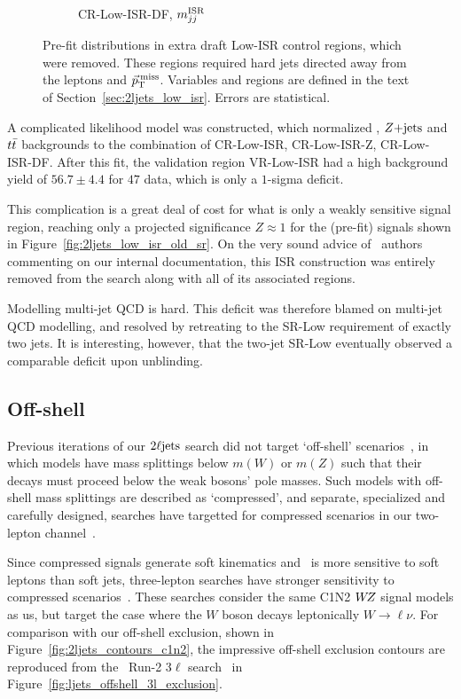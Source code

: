 \begin{figure}[tp]
\begin{subfigure}{0.62\textwidth}
\caption{CR-Low-ISR-DF, $m_{jj}^\mathrm{ISR}$}
\end{subfigure}
\caption[
Pre-fit distributions in extra draft Low-ISR control regions, which were
removed
]{%
Pre-fit distributions in extra draft Low-ISR control regions, which were
removed.
These regions required hard jets directed away from the leptons and $\vec p_\mathrm{T}^\mathrm{\:miss}$.
Variables and regions are defined in the text of
Section~\ref{sec:2ljets_low_isr}.
Errors are statistical.
}
\label{fig:2ljets_low_isr_old_more}
\end{figure}

A complicated likelihood model was constructed, which normalized \diboson,
$Z\mathrm{+jets}$ and $t\bar t$ backgrounds to the combination of CR-Low-ISR,
CR-Low-ISR-Z, CR-Low-ISR-DF.
After this fit, the validation region VR-Low-ISR had a high background yield
of $56.7 \pm 4.4$ for $47$ data, which is only a $1$-sigma deficit.

This complication is a great deal of cost for what is only a weakly sensitive
signal region, reaching only a projected significance $Z\approx 1$ for the
(pre-fit) signals shown in Figure~\ref{fig:2ljets_low_isr_old_sr}.
On the very sound advice of \atlas\ authors commenting on our internal
documentation, this ISR construction was entirely removed from the search
along with all of its associated regions.

Modelling multi-jet QCD is hard.
This deficit was therefore blamed on multi-jet QCD modelling, and resolved by
retreating to the SR-Low requirement of exactly two jets.
It is interesting, however, that the two-jet SR-Low eventually observed a
comparable deficit upon unblinding.


\subsection{Off-shell}
\label{sec:2ljets_offshell}
Previous iterations of our $2\ell\mathrm{jets}$ search did not target `off-shell'
scenarios~\cite{atlas_23l_SUSY_2016_24, atlas_2l_SUSY_2013_11}, in which
models have mass splittings below $m(W)$ or $m(Z)$ such that their decays must
proceed below the weak bosons' pole masses.
Such models with off-shell mass splittings are described as
`compressed', and separate, specialized and carefully designed, searches
have targetted for compressed scenarios in our two-lepton channel~\cite{
atlas_susy_compressed_2l_2016_partial_run2,
atlas_susy_compressed_2l_2018_run2
}.

Since compressed signals generate soft kinematics and \atlas\ is more sensitive
to soft leptons than soft jets, three-lepton searches have stronger sensitivity
to compressed scenarios~\cite{atlas_rjr_3l_SUSY_2019_09}.
These searches consider the same C1N2 $W\kern-0.4exZ$ signal models as us, but target the
case where the $W$ boson decays leptonically $W\to\ell\nu$.
For comparison with our off-shell exclusion,
shown in Figure~\ref{fig:2ljets_contours_c1n2},
the impressive off-shell exclusion contours are reproduced
from the \atlas\ Run-2 $3\ell$ search~\cite{atlas_rjr_3l_SUSY_2019_09} in
Figure~\ref{fig:ljets_offshell_3l_exclusion}.

